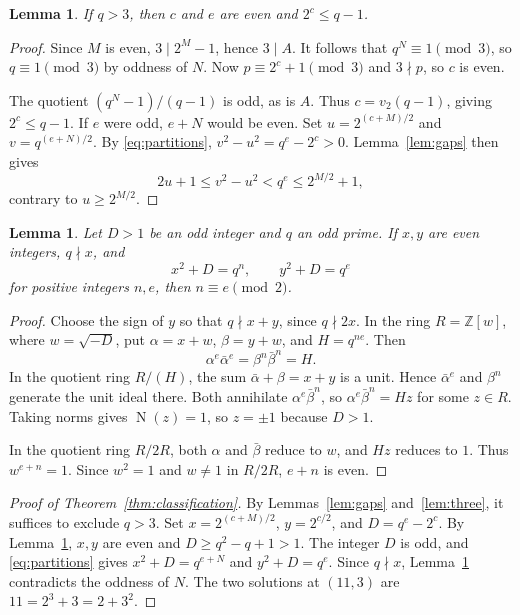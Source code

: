 \documentclass[11pt]{article}
\newtheorem{lemma}[theorem]{Lemma}
\DeclareMathOperator{\Nm}{N}
\begin{document}
\begin{lemma}\label{lem:exponents}
If $q>3$, then $c$ and $e$ are even and $2^c\le q-1$.
\end{lemma}

\begin{proof}
Since $M$ is even, $3\mid 2^M-1$, hence $3\mid A$.
It follows that $q^N\equiv1\pmod3$, so $q\equiv1\pmod3$ by oddness
of $N$. Now $p\equiv 2^c+1\pmod3$ and $3\nmid p$, so $c$ is even.

The quotient $(q^N-1)/(q-1)$ is odd, as is $A$.
Thus $c=v_2(q-1)$, giving $2^c\le q-1$.
If $e$ were odd, $e+N$ would be even. Set
$u=2^{(c+M)/2}$ and $v=q^{(e+N)/2}$. By \eqref{eq:partitions},
$v^2-u^2=q^e-2^c>0$. Lemma~\ref{lem:gaps} then gives
\[
2u+1\le v^2-u^2<q^e\le 2^{M/2}+1,
\]
contrary to $u\ge 2^{M/2}$.
\end{proof}

\begin{lemma}\label{lem:norm}
Let $D>1$ be an odd integer and $q$ an odd prime. If $x,y$ are
even integers, $q\nmid x$, and
\[
x^2+D=q^n,\qquad y^2+D=q^e
\]
for positive integers $n,e$, then $n\equiv e\pmod2$.
\end{lemma}

\begin{proof}
Choose the sign of $y$ so that $q\nmid x+y$, since $q\nmid2x$.
In the ring $R=\mathbb Z[w]$, where $w=\sqrt{-D}$, put
$\alpha=x+w$, $\beta=y+w$, and $H=q^{ne}$. Then
\[
\alpha^e\bar\alpha^e=\beta^n\bar\beta^n=H.
\]
In the quotient ring $R/(H)$, the sum $\bar\alpha+\beta=x+y$ is a unit. Hence
$\bar\alpha^e$ and $\beta^n$ generate the unit ideal there.
Both annihilate $\alpha^e\bar\beta^n$, so
$\alpha^e\bar\beta^n=Hz$ for some $z\in R$.
Taking norms gives $\Nm(z)=1$, so $z=\pm1$ because $D>1$.

In the quotient ring $R/2R$, both $\alpha$ and $\bar\beta$ reduce to $w$, and
$Hz$ reduces to $1$. Thus $w^{e+n}=1$. Since $w^2=1$ and
$w\ne1$ in $R/2R$, $e+n$ is even.
\end{proof}

\begin{proof}[Proof of Theorem~\ref{thm:classification}]
By Lemmas~\ref{lem:gaps} and~\ref{lem:three}, it suffices to exclude
$q>3$. Set $x=2^{(c+M)/2}$, $y=2^{c/2}$, and $D=q^e-2^c$.
By Lemma~\ref{lem:exponents}, $x,y$ are even and
$D\ge q^2-q+1>1$. The integer $D$ is odd, and
\eqref{eq:partitions} gives $x^2+D=q^{e+N}$ and $y^2+D=q^e$.
Since $q\nmid x$, Lemma~\ref{lem:norm} contradicts the oddness of $N$.
The two solutions at $(11,3)$ are $11=2^3+3=2+3^2$.
\end{proof}
\end{document}
